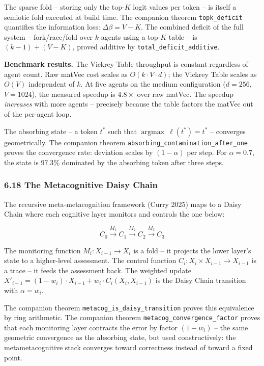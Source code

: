 \documentclass[
  11pt,
]{article}
\begin{document}
The sparse fold -- storing only the top-\(K\) logit values per token --
is itself a semiotic fold executed at build time. The companion theorem
\texttt{topk\_deficit} quantifies the information loss:
\(\Delta\beta = V - K\). The combined deficit of the full system --
fork/race/fold over \(k\) agents using a top-\(K\) table -- is
\((k - 1) + (V - K)\), proved additive by
\texttt{total\_deficit\_additive}.

\textbf{Benchmark results.} The Vickrey Table throughput is constant
regardless of agent count. Raw matVec cost scales as
\(O(k \cdot V \cdot d)\); the Vickrey Table scales as \(O(V)\)
independent of \(k\). At five agents on the medium configuration
(\(d = 256\), \(V = 1024\)), the measured speedup is \(4.8\times\) over
raw matVec. The speedup \emph{increases} with more agents -- precisely
because the table factors the matVec out of the per-agent loop.

The absorbing state -- a token \(t^*\) such that
\(\operatorname{argmax}\ \ell(t^*) = t^*\) -- converges geometrically.
The companion theorem \texttt{absorbing\_contamination\_after\_one}
proves the convergence rate: deviation scales by \((1 - \alpha)\) per
step. For \(\alpha = 0.7\), the state is \(97.3\%\) dominated by the
absorbing token after three steps.

\subsubsection{6.18 The Metacognitive Daisy
Chain}\label{the-metacognitive-daisy-chain}

The recursive meta-metacognition framework (Curry 2025) maps to a Daisy
Chain where each cognitive layer monitors and controls the one below:

\[C_0 \xrightarrow{M_1} C_1 \xrightarrow{M_2} C_2 \xrightarrow{M_3} C_3\]

The monitoring function \(M_i: X_{i-1} \to X_i\) is a fold -- it
projects the lower layer's state to a higher-level assessment. The
control function \(C_i: X_i \times X_{i-1} \to X_{i-1}\) is a trace --
it feeds the assessment back. The weighted update
\(X'_{i-1} = (1 - w_i) \cdot X_{i-1} + w_i \cdot C_i(X_i, X_{i-1})\) is
the Daisy Chain transition with \(\alpha = w_i\).

The companion theorem \texttt{metacog\_is\_daisy\_transition} proves
this equivalence by ring arithmetic. The companion theorem
\texttt{metacog\_convergence\_factor} proves that each monitoring layer
contracts the error by factor \((1 - w_i)\) -- the same geometric
convergence as the absorbing state, but used constructively: the
metametacognitive stack converges toward correctness instead of toward a
fixed point.
\end{document}
